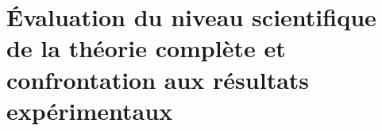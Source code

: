 
























































































\section{Évaluation du niveau scientifique de la théorie complète et confrontation aux résultats expérimentaux}

